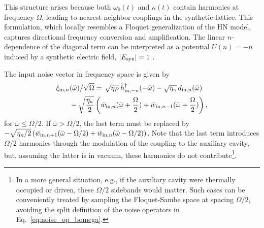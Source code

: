 \documentclass[a4paper,twocolumn,floatfix,10pt,superscriptaddress]%
{quantumarticle}
\newcommand{\bomega}{{\bar{\omega}}}
\newcommand{\rmin}{{{\rm in}}}
\begin{document}
This structure arises because both $\omega_0(t)$ and $\kappa(t)$ contain harmonics at frequency $\Omega$, leading to nearest-neighbor couplings in the synthetic lattice. This formulation, which locally resembles a Floquet generalization of the HN model, captures directional frequency conversion and amplification. The linear $n$-dependence of the diagonal term can be interpreted as a potential $U(n)=-n$ induced by a synthetic electric field, $|E_{\rm syn}| = 1$ \cite{GomezLeon2013,Martin2017}.


The input noise vector in frequency space is given by
\begin{align}\label{eq:noise_op_bomega}
\begin{aligned}
\bar{\xi}_{\rmin,n}&(\bomega)/\sqrt{\Omega}
= \,\sqrt{\eta_P}\, \tilde{h}^\dagger_{\rmin,-n}(-\bomega)- 
\sqrt{\eta_{\gamma}}\, \bar{d}_{\rmin,n}(\bomega)\\
&- \sqrt{\frac{\eta_\kappa}{2}} \left( \bar{w}_{\rmin,n}(\bomega + \frac{\Omega}{2}) + \bar{w}_{\rmin,n-1}(\bomega + \frac{\Omega}{2}) \right),
\end{aligned} 
\end{align}
for $\bomega \leq \Omega/2$. If 
$\bomega > \Omega/2$, the last term must be replaced by $-\sqrt{\eta_\kappa/2}
\left( \bar{w}_{\rmin,n+1}(\bomega - \Omega/2) + \bar{w}_{\rmin,n}(\bomega - \Omega/2) \right)$. Note that the last term introduces $\Omega/2$ harmonics through the modulation of the coupling to the auxiliary cavity, but, assuming the latter is in vacuum, these harmonics do not contribute\footnote{In a more general situation, e.g., if the auxiliary cavity were thermally occupied or driven, these $\Omega/2$ sidebands would matter. Such cases can be conveniently treated by sampling the Floquet-Sambe space at spacing $\Omega/2$, avoiding the split definition of the noise operators in Eq.~\eqref{eq:noise_op_bomega}.}. 
\end{document}

